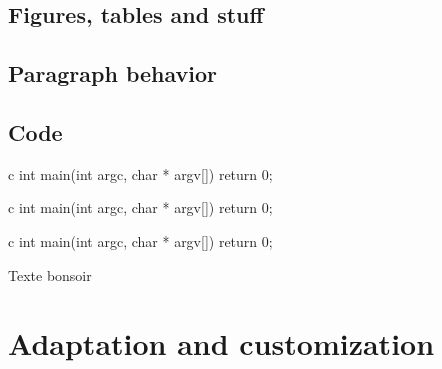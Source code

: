 \documentclass[raggedright, 11pt]{tufte-style-article}
\begin{document}
\subsection{Figures, tables and stuff}

\subsection{Paragraph behavior}

\subsection{Code}

\begin{codebox}{c}
int main(int argc, char * argv[]) {
	return 0;	
}
\end{codebox}

\begin{codeboxnonos}{c}
int main(int argc, char * argv[]) {
	return 0;	
}
\end{codeboxnonos}

\begin{nextcodebox}{c}
int main(int argc, char * argv[]) {
	return 0;	
}
\end{nextcodebox}

Texte  bonsoir

\section{Adaptation and customization}
\end{document}

